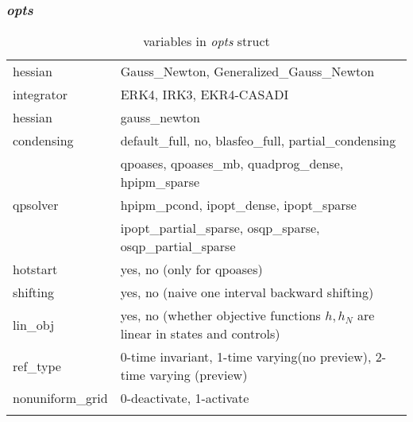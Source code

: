 \documentclass{article}
\newcommand{\alert}[1]{{\textit{#1}}}
\begin{document}
\subsubsection{\alert{opts}}
\begin{longtable}{l|l}
	\hline
		hessian          & Gauss\_Newton, Generalized\_Gauss\_Newton
		\\
		integrator       & ERK4, IRK3, EKR4-CASADI                                                                                                                                      \\
		hessian          & gauss\_newton                                                                                                                                                \\
		condensing       & default\_full, no, blasfeo\_full, partial\_condensing                                                                                                        \\ \hline
		\multirow{3}{*}{qpsolver} & qpoases, qpoases\_mb, quadprog\_dense, hpipm\_sparse        \\
		& hpipm\_pcond, ipopt\_dense, ipopt\_sparse                   \\
		& ipopt\_partial\_sparse, osqp\_sparse, osqp\_partial\_sparse \\ \hline
		hotstart         & yes, no (only for qpoases)                                                                                                                                                     \\
		shifting         & yes, no (naive one interval backward shifting)                                                                                                                                                      \\
		lin\_obj         & yes, no (whether objective functions $h,h_N$ are linear in states and controls)                                                                                                                                                     \\
		ref\_type        & 0-time invariant, 1-time varying(no preview), 2-time varying (preview)                                                                                                                                                     \\
		nonuniform\_grid & 0-deactivate, 1-activate\\ \hline        		
	\caption{variables in \alert{opts} struct}
	\label{table:opts}                                                        
\end{longtable}
\end{document}
